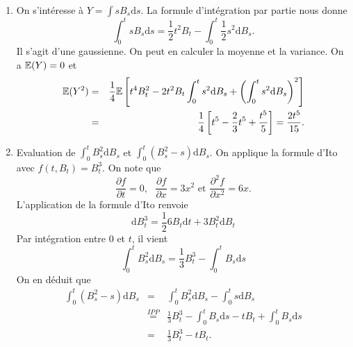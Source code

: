 \begin{ex}
\begin{enumerate}
\item On s'intéresse à $Y = \int sB_s\text{d}s$. La formule d'intégration par partie nous donne
$$
\int_0^t sB_s\text{d}s = \frac12 t^2 B_t -\int_0^t \frac12 s^2 \text{d}B_s.
$$
Il s'agit d'une \va gaussienne. On peut en calculer la moyenne et la variance. On a $\mathbb{E}(Y) = 0$  et
\begin{eqnarray*}
\mathbb{E}(Y^2) &=& \frac 14\mathbb{E}\left[t^4B_t^2 - 2t^2B_t\int_0^t s^2\text{d}B_s +\left(\int_0^t s^2\text{d}B_s \right)^2\right]\\
&=& \frac 14\left[t^5-\frac23t^5 + \frac{t^5}{5}\right]=\frac{2t^5}{15}.
\end{eqnarray*}
\item Evaluation de $\int_0^t B_s^2\text{d}B_s$ et $\int_{0}^t(B_s^2 - s)\text{d}B_s$. On applique la formule d'Ito avec $f(t,B_t) = B_t^3$. On note que 
	$$
	\frac{\partial f}{\partial t} = 0,\text{ }\frac{\partial f}{\partial x} = 3x^2\text{ et }\frac{\partial^2 f}{\partial x^2} = 6x.
	$$
	L'application de la formule d'Ito renvoie
	$$
	\text{d}B_t^3 = \frac{1}{2}6B_t\text{d}t + 3B_t^2\text{d}B_t
	$$
	Par intégration entre $0$ et $t$, il vient
	$$
	\int_0^tB_s^2\text{d}B_s = \frac{1}{3}B_t^3-\int_{0}^tB_s\text{d}s
	$$
	On en déduit que 
	\begin{eqnarray*}
	\int_{0}^t(B_s^2 - s)\text{d}B_s&=&\int_{0}^tB_s^2 \text{d}B_s - \int_{0}^ts\text{d}B_s\\
	&\overset{IPP}{=}&\frac{1}{3}B_t^3-\int_{0}^tB_s\text{d}s - tB_t + \int_{0}^tB_s\text{d}s\\
	&=&\frac{1}{3}B_t^3 - tB_t.
	\end{eqnarray*}
	\end{enumerate}
\end{ex}


